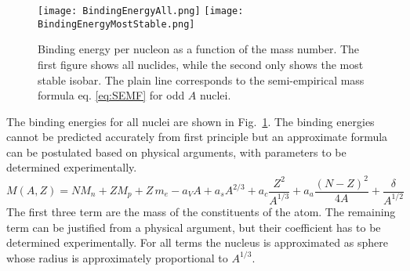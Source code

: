\begin{figure}
\texttt{[image: BindingEnergyAll.png]}
\texttt{[image: BindingEnergyMostStable.png]}
\caption{Binding energy per nucleon as a function of the mass number. The first figure shows all nuclides, while the second only shows the most stable isobar. The plain line corresponds to the semi-empirical mass formula eq. \ref{eq:SEMF} for odd $A$ nuclei.}\label{fig:bindingEnergies}
\end{figure}

The binding energies for all nuclei are shown in Fig.~\ref{fig:bindingEnergies}. The binding energies cannot be predicted accurately from first principle but an approximate formula can be postulated based on physical arguments, with parameters to be determined experimentally. 
\begin{equation}\label{eq:SEMF}
M(A,Z)=N M_n+Z M_p+Z\, m_e-a_V A + a_sA^{2/3}+a_c\frac{Z^2}{A^{1/3}}+a_a\frac{(N-Z)^2}{4A}+\frac{\delta}{A^{1/2}}
\end{equation}  
The first three term are the mass of the constituents of the atom. The remaining term can be justified from a physical argument, but their coefficient has to be determined experimentally. For all terms the nucleus is approximated as sphere whose radius is approximately proportional to $A^{1/3}$.
